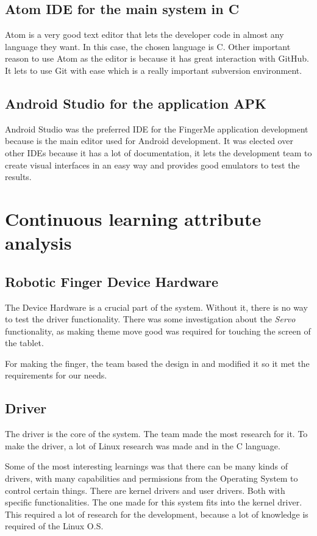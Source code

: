 \documentclass[12pt]{article}
\begin{document}
\subsection{Atom IDE for the main system in C}
Atom is a very good text editor that lets the developer code in almost any language they want. In this case, the chosen language is C. Other important reason to use Atom as the editor is because it has great interaction with GitHub. It lets to use Git with ease which is a really important subversion environment.

\subsection{Android Studio for the application APK}
Android Studio was the preferred IDE for the FingerMe application development because is the main editor used for Android development. It was elected over other IDEs because it has a lot of documentation, it lets the development team to create visual interfaces in an easy way and provides good emulators to test the results.

\section{Continuous learning attribute analysis}

\subsection{Robotic Finger Device Hardware}
The Device Hardware is a crucial part of the system. Without it, there is no way to test the driver functionality. There was some investigation about the \textit{Servo} functionality, as making theme move good was required for touching the screen of the tablet.

For making the finger, the team based the design in \cite{finger} and modified it so it met the requirements for our needs.

\subsection{Driver}
The driver is the core of the system. The team made the most research for it. To make the driver, a lot of Linux research was made and in the C language.

Some of the most interesting learnings was that there can be many kinds of drivers, with many capabilities and permissions from the Operating System to control certain things. There are kernel drivers and user drivers. Both with specific functionalities. The one made for this system fits into the kernel driver. This required a lot of research for the development, because a lot of knowledge is required of the Linux O.S.
\end{document}
